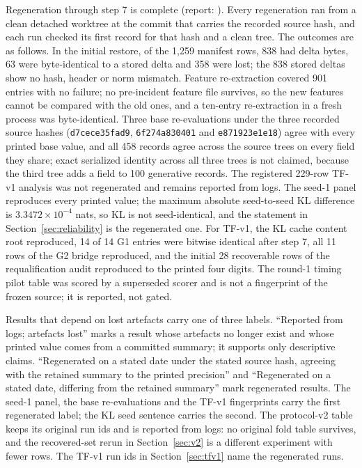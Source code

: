 Regeneration through step 7 is complete (report: ). Every regeneration ran from a clean detached worktree at the commit that carries the recorded source hash, and each run checked its first record for that hash and a clean tree. The outcomes are as follows. In the initial restore, of the 1,259 manifest rows, 838 had delta bytes, 63 were byte-identical to a stored delta and 358 were lost; the 838 stored deltas show no hash, header or norm mismatch. Feature re-extraction covered 901 entries with no failure; no pre-incident feature file survives, so the new features cannot be compared with the old ones, and a ten-entry re-extraction in a fresh process was byte-identical. Three base re-evaluations under the three recorded source hashes (\texttt{d7cece35fad9}, \texttt{6f274a830401} and \texttt{e871923e1e18}) agree with every printed base value, and all 458 records agree across the source trees on every field they share; exact serialized identity across all three trees is not claimed, because the third tree adds a field to 100 generative records. The registered 229-row TF-v1 analysis was not regenerated and remains reported from logs. The seed-1 panel reproduces every printed value; the maximum absolute seed-to-seed KL difference is $3.3472\times10^{-4}$ nats, so KL is not seed-identical, and the statement in Section~\ref{sec:reliability} is the regenerated one. For TF-v1, the KL cache content root reproduced, 14 of 14 G1 entries were bitwise identical after step 7, all 11 rows of the G2 bridge reproduced, and the initial 28 recoverable rows of the requalification audit reproduced to the printed four digits. The round-1 timing pilot table was scored by a superseded scorer and is not a fingerprint of the frozen source; it is reported, not gated.

Results that depend on lost artefacts carry one of three labels. ``Reported from logs; artefacts lost'' marks a result whose artefacts no longer exist and whose printed value comes from a committed summary; it supports only descriptive claims. ``Regenerated on a stated date under the stated source hash, agreeing with the retained summary to the printed precision'' and ``Regenerated on a stated date, differing from the retained summary'' mark regenerated results. The seed-1 panel, the base re-evaluations and the TF-v1 fingerprints carry the first regenerated label; the KL seed sentence carries the second. The protocol-v2 table keeps its original run ids and is reported from logs: no original fold table survives, and the recovered-set rerun in Section~\ref{sec:v2} is a different experiment with fewer rows. The TF-v1 run ids in Section~\ref{sec:tfv1} name the regenerated runs.

